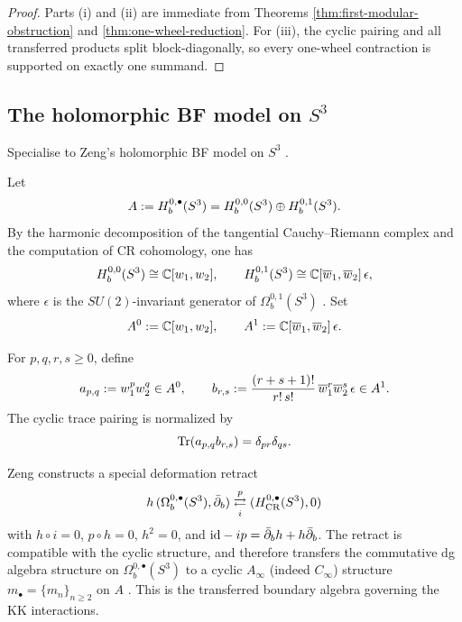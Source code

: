 \begin{proof}
Parts \textup{(i)} and \textup{(ii)} are immediate from Theorems
\ref{thm:first-modular-obstruction} and \ref{thm:one-wheel-reduction}. For
\textup{(iii)}, the cyclic pairing and all transferred products split block-diagonally, so every
one-wheel contraction is supported on exactly one summand.
\end{proof}

\subsection{The holomorphic BF model on $S^3$}
\label{subsec:holomorphic-bf-model-on-s3}

Specialise to Zeng's holomorphic BF model on $S^3$ \cite{ZengTwistedHolography}.

\begin{definition}
\label{def:cr-cohomological-boundary-algebra}
Let
\[
A:=H_b^{0,\bullet}(S^3) = H_b^{0,0}(S^3)\oplus H_b^{0,1}(S^3).
\]
By the harmonic decomposition of the tangential Cauchy--Riemann complex and the computation
of CR cohomology, one has
\[
H_b^{0,0}(S^3)\cong \mathbb C[w_1,w_2],
\qquad
H_b^{0,1}(S^3)\cong \mathbb C[\overline{w}_1,\overline{w}_2]\,\epsilon,
\]
where $\epsilon$ is the $SU(2)$-invariant generator of $\Omega_b^{0,1}(S^3)$
\cite{ZengTwistedHolography}. Set
\[
A^0:=\mathbb C[w_1,w_2],
\qquad
A^1:=\mathbb C[\overline{w}_1,\overline{w}_2]\,\epsilon.
\]
\end{definition}

\begin{definition}
\label{def:monomial-bases-and-trace-pairing}
For $p,q,r,s\ge 0$, define
\[
a_{p,q}:=w_1^p w_2^q\in A^0,
\qquad
b_{r,s}:=\frac{(r+s+1)!}{r!\,s!}\,\overline{w}_1^r\overline{w}_2^s\,\epsilon\in A^1.
\]
The cyclic trace pairing is normalized by
\[
\operatorname{Tr}(a_{p,q}b_{r,s})=\delta_{pr}\delta_{qs}.
\]
\end{definition}

\begin{remark}
\label{rem:cyclic-sdr}
Zeng constructs a special deformation retract
\[
h\,(\Omega_b^{0,\bullet}(S^3),\bar\partial_b)
\underset{i}{\overset{p}{\rightleftarrows}}
(H_{\mathrm{CR}}^{0,\bullet}(S^3),0)
\]
with $h\circ i=0$, $p\circ h=0$, $h^2=0$, and $\mathrm{id}-ip=\bar\partial_b h+h\bar\partial_b$.
The retract is compatible with the cyclic structure, and therefore transfers the
commutative dg algebra structure on $\Omega_b^{0,\bullet}(S^3)$ to a cyclic $A_\infty$ (indeed
$C_\infty$) structure $m_\bullet=\{m_n\}_{n\ge 2}$ on $A$ \cite{ZengTwistedHolography}.
This is the transferred boundary algebra governing the KK interactions.
\end{remark}

